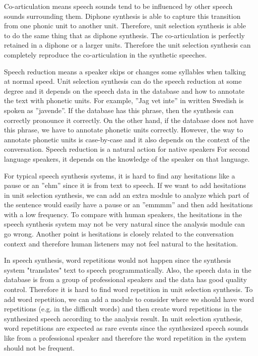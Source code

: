 \documentclass[12pt]{article}
\newenvironment{problem}[2][Problem]{\begin{trivlist}
\item[\hskip \labelsep {\bfseries #1}\hskip \labelsep {\bfseries #2.}]}{\end{trivlist}}
\begin{document}
\begin{problem}{2.2}

    Co-articulation means speech sounds tend to be influenced by other speech 
    sounds surrounding them. 
    Diphone synthesis is able to capture this transition from one phonic unit 
    to another unit. 
    Therefore, unit selection synthesis is able to do the same thing that as 
    diphone synthesis. 
    The co-articulation is perfectly retained in a diphone or a larger units.
    Therefore the unit selection synthesis can completely reproduce the 
    co-articulation in the synthetic speeches.


    Speech reduction means a speaker skips or changes some syllables when talking
    at normal speed. 
    Unit selection synthesis can do the speech reduction at some degree and 
    it depends on the speech data in the database and how to annotate the text 
    with phonetic units. 
    For example, ”Jag vet inte” in written Swedish is spoken as ”javende”. 
    If the database has this phrase, then the synthesis can correctly pronounce 
    it correctly. 
    On the other hand, if the database does not have this phrase, we have to 
    annotate phonetic units correctly. 
    However, the way to annotate phonetic units is case-by-case and 
    it also depends on the context of the conversation. 
    Speech reduction is a natural action for native speakers
    For second language speakers, it depends on the knowledge of the speaker 
    on that language.

    For typical speech synthesis systems, it is hard to find any hesitations 
    like a pause or an ”ehm” since it is from text to speech.
    If we want to add hesitations in unit selection synthesis, we can add an 
    extra module to analyze which part of the sentence would easily have a 
    pause or an ”emmmm” and then add hesitations with a low frequency. 
    To compare with human speakers, the hesitations in the speech synthesis 
    system may not be very natural since the analysis module can go wrong. 
    Another point is hesitations is closely related to the conversation context 
    and therefore human listeners may not feel natural to the hesitation.

    In speech synthesis, word repetitions would not happen since the synthesis 
    system "translates" text to speech programmatically. 
    Also, the speech data in the database is from a group of professional speakers
    and the data has good quality control. 
    Therefore it is hard to find word repetition in unit selection synthesis. 
    To add word repetition, we can add a module to consider where we should have 
    word repetitions (e.g. in the difficult words) and then create word repetitions 
    in the synthesized speech according to the analysis result. 
    In unit selection synthesis, word repetitions are expected as rare events 
    since the synthesized speech sounds like from a professional speaker and 
    therefore the word repetition in the system should not be frequent.
\end{problem}
\end{document}
